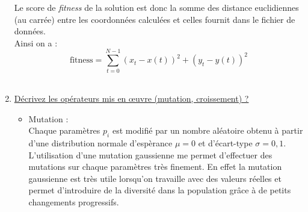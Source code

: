 \documentclass[11pt]{report}
\begin{document}
\begin{enumerate}
	Le score de \textit{fitness} de la solution est donc la somme des distance euclidiennes (au carrée) entre les coordonnées calculées et celles fournit dans le fichier de données. \\
	Ainsi on a :
	$$	\mbox{fitness} = \sum_{t=0}^{N-1} (x_t-x(t))^2 + (y_t-y(t))^2 $$ \\
	\item \underline{Décrivez les opérateurs mis en œuvre (mutation, croissement) ?} \\ 
	\begin{itemize}
		\item Mutation : \\
		Chaque paramètres $p_i$ est modifié par un nombre aléatoire obtenu à partir d'une distribution normale d'espèrance $\mu=0$ et d'écart-type $\sigma = 0,1$.\\ L'utilisation d'une mutation gaussienne me permet d'effectuer des mutations sur chaque paramètres très finement. En effet la mutation gaussienne est très utile lorsqu'on travaille avec des valeurs réelles et permet d'introduire de la diversité dans la population grâce à de petits changements progressifs.
	\end{itemize}
\end{enumerate}
\end{document}
